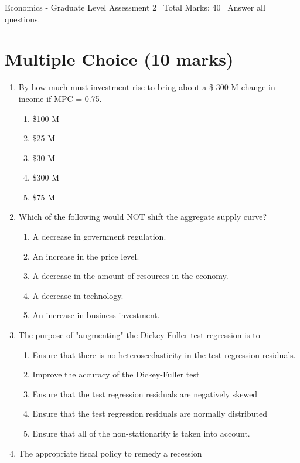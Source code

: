 \documentclass[12pt]{article}
\begin{document}
\begin{center}
Economics - Graduate Level Assessment 2 \
Total Marks: 40 \
Answer all questions.
\end{center}

\section*{Multiple Choice (10 marks)}
\begin{enumerate}[label=\arabic*.]
\item By how much must investment rise to bring about a \$ 300 M change in income if MPC = 0.75.
\begin{enumerate}[label=(\alph*)]
    \item \$100 M
    \item \$25 M
    \item \$30 M
    \item \$300 M
    \item \$75 M
\end{enumerate}
\item Which of the following would NOT shift the aggregate supply curve?
\begin{enumerate}[label=(\alph*)]
    \item A decrease in government regulation.
    \item An increase in the price level.
    \item A decrease in the amount of resources in the economy.
    \item A decrease in technology.
    \item An increase in business investment.
\end{enumerate}
\item The purpose of "augmenting" the Dickey-Fuller test regression is to
\begin{enumerate}[label=(\alph*)]
    \item Ensure that there is no heteroscedasticity in the test regression residuals.
    \item Improve the accuracy of the Dickey-Fuller test
    \item Ensure that the test regression residuals are negatively skewed
    \item Ensure that the test regression residuals are normally distributed
    \item Ensure that all of the non-stationarity is taken into account.
\end{enumerate}
\item The appropriate fiscal policy to remedy a recession

\end{enumerate}
\end{document}
